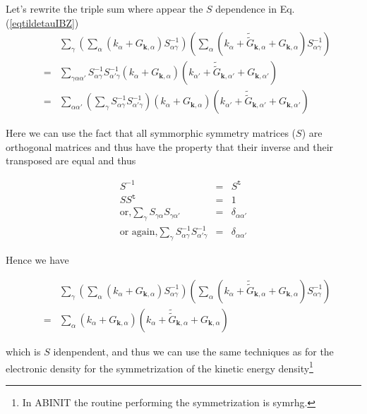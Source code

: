 \documentclass[a4paper,12pt]{report}
\begin{document}
Let's rewrite the triple sum where appear the $S$ dependence in Eq.(\ref{eqtildetauIBZ})
\begin{eqnarray}
&& \sum_{\gamma} \left(\sum_{\alpha}\left( k_{\alpha} + G_{\mathbf{k},\alpha}\right) S_{\alpha\gamma}^{-1} \right) \left(\sum_{\alpha}\left( k_{\alpha} + \tilde{\tilde{G}}_{\mathbf{k},\alpha} + G_{\mathbf{k},\alpha}\right) S_{\alpha\gamma}^{-1} \right) \\
&=& \sum_{\gamma\alpha\alpha'} S_{\alpha\gamma}^{-1} S_{\alpha'\gamma}^{-1} \left( k_{\alpha} + G_{\mathbf{k},\alpha} \right)  \left( k_{\alpha'} + \tilde{\tilde{G}}_{\mathbf{k},\alpha'} + G_{\mathbf{k},\alpha'}\right) \\
&=& \sum_{\alpha\alpha'} \left(\sum_{\gamma} S_{\alpha\gamma}^{-1} S_{\alpha'\gamma}^{-1}\right) \left( k_{\alpha} + G_{\mathbf{k},\alpha} \right)  \left( k_{\alpha'} + \tilde{\tilde{G}}_{\mathbf{k},\alpha'} + G_{\mathbf{k},\alpha'}\right)
\end{eqnarray}

Here we can use the fact that all symmorphic symmetry matrices ($S$) are orthogonal matrices and thus have the property that their inverse and their transposed are equal and thus

\begin{eqnarray}
S^{-1} &=& S^{{\mathtt{t}}} \\
SS^{{\mathtt{t}}} &=& 1 \\
\text{or,} \sum_{\gamma} S_{\gamma\alpha} S_{\gamma\alpha'} &=& \delta_{\alpha\alpha'} \\
\text{or again,} \sum_{\gamma} S^{-1}_{\alpha\gamma} S^{-1}_{\alpha'\gamma} &=& \delta_{\alpha\alpha'}
\end{eqnarray}

Hence we have

\begin{eqnarray}
&& \sum_{\gamma} \left(\sum_{\alpha}\left( k_{\alpha} + G_{\mathbf{k},\alpha}\right) S_{\alpha\gamma}^{-1} \right) \left(\sum_{\alpha}\left( k_{\alpha} + \tilde{\tilde{G}}_{\mathbf{k},\alpha} + G_{\mathbf{k},\alpha}\right) S_{\alpha\gamma}^{-1} \right) \\
&=& \sum_{\alpha} \left( k_{\alpha} + G_{\mathbf{k},\alpha} \right)  \left( k_{\alpha} + \tilde{\tilde{G}}_{\mathbf{k},\alpha} + G_{\mathbf{k},\alpha}\right)
\end{eqnarray}

which is $S$ idenpendent, and thus we can use the same techniques as for the electronic density for the symmetrization of the kinetic energy density\footnote{In ABINIT the routine performing the symmetrization is symrhg.}
\end{document}
